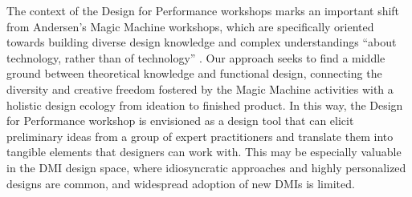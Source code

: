 \documentclass[letterpaper, 12pt]{article}
\begin{document}
The context of the Design for Performance workshops marks an important shift from Andersen's Magic Machine workshops, which are specifically oriented towards building diverse design knowledge and complex understandings ``about technology, rather than of technology'' \citep[p. 1]{Andersen2019}. Our approach seeks to find a middle ground between theoretical knowledge and functional design, connecting the diversity and creative freedom fostered by the Magic Machine activities with a holistic design ecology from ideation to finished product. In this way, the Design for Performance workshop is envisioned as a design tool that can elicit preliminary ideas from a group of expert practitioners and translate them into tangible elements that designers can work with. This may be especially valuable in the DMI design space, where idiosyncratic approaches and highly personalized designs are common, and widespread adoption of new DMIs is limited.



\end{document}
